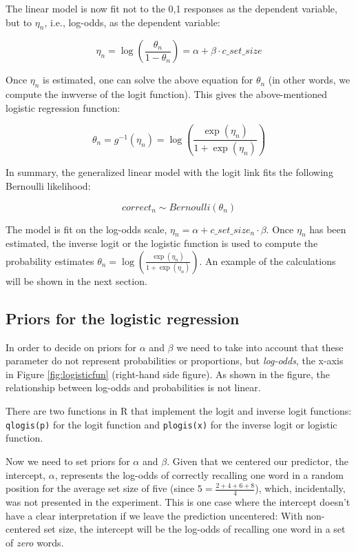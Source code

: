 \documentclass[12pt,]{krantz}
\theoremstyle{definition}
\theoremstyle{definition}
\theoremstyle{definition}
\theoremstyle{remark}
\begin{document}
The linear model is now fit not to the 0,1 responses as the dependent
variable, but to \(\eta_n\), i.e., log-odds, as the dependent variable:

\begin{equation}
\eta_n = \log\left(\frac{\theta_n}{1-\theta_n}\right) = \alpha + \beta \cdot c\_set\_size
\end{equation}

Once \(\eta_n\) is estimated, one can solve the above equation for
\(\theta_n\) (in other words, we compute the inwverse of the logit
function). This gives the above-mentioned logistic regression function:

\begin{equation}
\theta_n = g^{-1}(\eta_n) =  \log\left(\frac{\exp(\eta_n)}{1+\exp(\eta_n)}\right)
\end{equation}

In summary, the generalized linear model with the logit link fits the
following Bernoulli likelihood:

\begin{equation}
correct_n \sim Bernoulli(\theta_n)
\label{eq:bernoullilogislik}
\end{equation}

The model is fit on the log-odds scale,
\(\eta_n = \alpha + c\_set\_size_n \cdot \beta\). Once \(\eta_n\) has
been estimated, the inverse logit or the logistic function is used to
compute the probability estimates
\(\theta_n = \log(\frac{\exp(\eta_n)}{1+\exp(\eta_n)})\). An example of
the calculations will be shown in the next section.

\subsection{Priors for the logistic
regression}\label{priors-for-the-logistic-regression}

In order to decide on priors for \(\alpha\) and \(\beta\) we need to
take into account that these parameter do not represent probabilities or
proportions, but \emph{log-odds}, the x-axis in Figure
\ref{fig:logisticfun} (right-hand side figure). As shown in the figure,
the relationship between log-odds and probabilities is not linear.

There are two functions in R that implement the logit and inverse logit
functions: \texttt{qlogis(p)} for the logit function and
\texttt{plogis(x)} for the inverse logit or logistic function.

Now we need to set priors for \(\alpha\) and \(\beta\). Given that we
centered our predictor, the intercept, \(\alpha\), represents the
log-odds of correctly recalling one word in a random position for the
average set size of five (since \(5 = \frac{2+4+6+8}{4}\)), which,
incidentally, was not presented in the experiment. This is one case
where the intercept doesn't have a clear interpretation if we leave the
prediction uncentered: With non-centered set size, the intercept will be
the log-odds of recalling one word in a set of \emph{zero} words.
\end{document}
